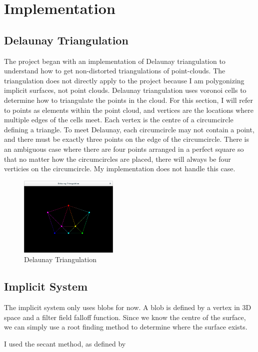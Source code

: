 \documentclass[conference]{acmsiggraph}
\begin{document}
\section {Implementation}

\subsection{Delaunay Triangulation}
The project began with an implementation of Delaunay triangulation to
understand how to get non-distorted triangulations of point-clouds. The
triangulation does not directly apply to the project because I am polygonizing
implicit surfaces, not point clouds. Delaunay triangulation uses voronoi cells
to determine how to triangulate the points in the cloud. For this section, I
will refer to points as elements within the point cloud, and vertices are the
locations where multiple edges of the cells meet. Each vertex is the centre of
a circumcircle defining a triangle. To meet Delaunay, each circumcircle may not
contain a point, and there must be exactly three points on the edge of the
circumcircle. There is an ambiguous case where there are four points arranged
in a perfect square so that no matter how the circumcircles are placed, there
will always be four verticies on the circumcircle. My implementation does not
handle this case.
\begin{figure}
	\centering
	\includegraphics[height=1.5in]{images/Triangulated.png}
	\caption{Delaunay Triangulation}
\end{figure}


\subsection{Implicit System}

The implicit system only uses blobs for now. A blob is defined by a vertex in
3D space and a filter field falloff function. Since we know the centre of the
surface, we can simply use a root finding method to determine where the surface
exists.

I used the secant method, as defined by
\end{document}
